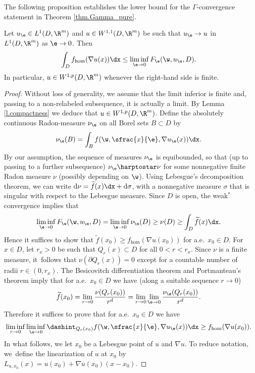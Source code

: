 The following proposition establishes the lower bound for the $\Gamma$-convergence statement in Theorem \ref{thm.Gamma_pure}.
\begin{proposition}\label{p.lb}
Let $u_{\e}\in L^1(D,\R^m)$ and $u\in W^{1,1}(D,\R^m)$ be such that $u_{\e}\to u$ in $L^1(D,\R^m)$ as $\e\to 0$. Then
\begin{equation*}
\int_D f_{\hom}(\nabla u(x))\dx\leq\liminf_{\e\to 0}F_{\e}(\w,u_{\e},D).
\end{equation*}
In particular, $u\in W^{1,p}(D,\R^m)$ whenever the right-hand side is finite.
\end{proposition}
\begin{proof}
Without loss of generality, we assume that the limit inferior is finite and, passing to a non-relabeled subsequence, it is actually a limit. By Lemma \ref{l.compactness} we deduce that $u\in W^{1,p}(D,\R^m)$. Define the absolutely continuous Radon-measure $\nu_{\e}$ on all Borel sets $B\subset D$ by
\begin{equation*}
\nu_{\e}(B)=\int_B f(\w,\sfrac{x}{\e},\nabla u_{\e}(x))\dx.
\end{equation*}
By our assumption, the sequence of measures $\nu_{\e}$ is equibounded, so that (up to passing to a further subsequence) $\nu_{\e}\harptostar\nu$ for some nonnegative finite Radon measure $\nu$ (possibly depending on $\w$). Using Lebesgue's decomposition theorem, we can write $\mathrm{d}\nu= \widetilde{f}(x)\dx+ \mathrm{d}\sigma$, with a nonnegative measure $\sigma$ that is singular with respect to the Lebesgue measure. Since $D$ is open, the weak$^*$ convergence implies that
\begin{equation*}
\liminf_{\e\to 0}F_{\e}(\w,u_{\e},D)=\liminf_{\e\to 0}\nu_{\e}(D)\geq \nu(D)\geq \int_{D}\widetilde{f}(x)\dx.
\end{equation*}
Hence it suffices to show that $\widetilde{f}(x_0)\geq f_{\hom}(\nabla u(x_0))$ for a.e.\ $x_0\in D$. For $x\in D$, let $r_x>0$ be such that $Q_r(x)\subset D$ for all $0<r<r_x$. Since $\nu$ is a finite measure, it~follows that $\nu(\partial Q_r(x))=0$ except for a countable number of radii $r\in (0,r_x)$. The Besicovitch differentiation theorem \cite[Th.\,1.153]{FoLe} and Portmanteau's theorem imply that for a.e.\ $x_0\in D$ we have (along a suitable sequence $r\to 0$)
\begin{equation*}
\widetilde{f}(x_0)=\lim_{r\to 0}\frac{\nu(Q_{r}(x_0))}{r^d}= \lim_{r\to 0}\lim_{\e\to 0}\frac{\nu_{\e}(Q_{r}(x_0))}{r^d}.
\end{equation*}
Therefore it suffices to prove that for a.e.\ $x_0\in D$ we have
\begin{equation}\label{eq:blowup}
\liminf_{r\to 0}\liminf_{\e\to 0}\dashint_{Q_r(x_0)}f(\w,\sfrac{x}{\e},\nabla u_{\e}(x))\dx\geq f_{\hom}(\nabla u(x_0)).
\end{equation}
In what follows, we let $x_0$ be a Lebesgue point of $u$ and $\nabla u$. To reduce notation, we~define the linearization of $u$ at $x_0$ by $L_{u,x_0}(x)=u(x_0)+\nabla u(x_0)(x-x_0)$.


\end{proof}
